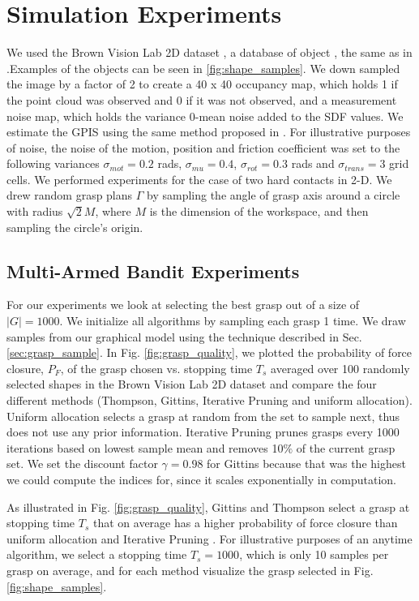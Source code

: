 \documentclass[10pt, conference]{ieeeconf}      %
\begin{document}
\section{Simulation Experiments}
We used the Brown Vision Lab 2D dataset \cite{brown}, a database of object ,  the same as in \cite{christopoulos2007handling}.Examples of the objects can be seen in \ref{fig:shape_samples}.  We down sampled the image by a factor of 2 to create a 40 x 40 occupancy map, which holds 1 if the point cloud was observed and 0 if it was not observed, and a measurement noise map, which holds the variance 0-mean noise added to the SDF values. We estimate the GPIS using the same method proposed in \cite{mahler2015gp}. For illustrative purposes of noise, the noise of the motion, position and friction coefficient was set to the following variances $\sigma_{mot} = 0.2$ rads, $\sigma_{mu} = 0.4$, $\sigma_{rot} = 0.3$ rads and $\sigma_{trans} = 3$ grid cells.
We performed experiments for the case of two hard contacts in 2-D. We drew random grasp plans $\Gamma$ by sampling the angle of grasp axis around a circle with radius $\sqrt{2} M$, where $M$ is the dimension of the workspace, and then sampling the circle's origin. 





\subsection{Multi-Armed Bandit Experiments}
For our experiments we look at selecting the best grasp out of a size of $|G| = 1000$. We initialize all algorithms by sampling each grasp 1 time. We draw samples from our graphical model using the technique described in Sec.  \ref{sec:grasp_sample}. In Fig. \ref{fig:grasp_quality}, we plotted the probability of force closure, $P_F$, of the grasp chosen vs. stopping time $T_s$ averaged over 100 randomly selected shapes in the Brown Vision Lab 2D dataset and compare the four different methods (Thompson, Gittins, Iterative Pruning \cite{kehoe2012toward} and uniform allocation). Uniform allocation selects a grasp at random from the set to sample next, thus does not use any prior information. Iterative Pruning prunes grasps every 1000 iterations based on lowest sample mean and removes 10$\%$ of the current grasp set.  We set the discount factor $\gamma =0.98$ for Gittins because that was the highest we could compute the indices for, since it scales exponentially in computation. 

 As illustrated in Fig. \ref{fig:grasp_quality}, Gittins and Thompson select a grasp at stopping time $T_s$ that on average has a higher probability of force closure than uniform allocation and Iterative Pruning . For illustrative purposes of an anytime algorithm,  we select a stopping time $T_s=1000$, which is only 10 samples per grasp on average, and for each method visualize the grasp selected in Fig. \ref{fig:shape_samples}. 
\end{document}
